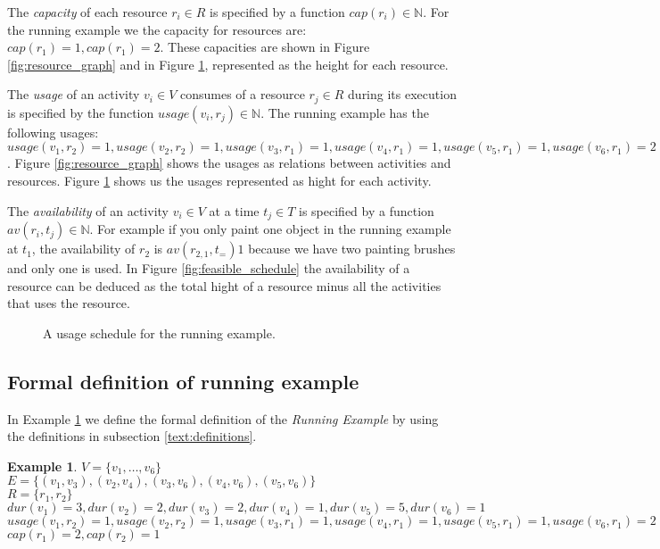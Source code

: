 \documentclass{article}
\theoremstyle{definition}
\newtheorem{example}{Example}[section]
\newcommand{\res}[0]{\ensuremath{R}} %
\newcommand{\av}[2]{\ensuremath{av(r_{#1}, t_{#2})}} %
\newcommand{\capa}[1]{\ensuremath{cap(r_{#1})}} %
\newcommand{\dur}[1]{\ensuremath{dur(v_{#1})}} %
\newcommand{\usage}[2]{\ensuremath{usage(v_{#1}, r_{#2})}} %
\begin{document}
The \emph{capacity} of each resource $r_i \in R$ is specified by a function $\capa{i} \in \mathbb{N}$.
For the running example we the capacity for resources are: $\capa{1} = 1, \capa{1} = 2$.
These capacities are shown in Figure \ref{fig:resource_graph} and in Figure \ref{fig:usage_graph}, represented as the height for each resource.

The \emph{usage} of an activity $v_i \in V$ consumes of a resource $r_j \in \res$ during its execution is specified by the function $\usage{i}{j} \in \mathbb{N}$.
The running example has the following usages: $\usage{1}{2} = 1, \usage{2}{2} = 1, \usage{3}{1} = 1, \usage{4}{1} = 1, \usage{5}{1} = 1, \usage{6}{1} = 2$.
Figure \ref{fig:resource_graph} shows the usages as relations between activities and resources.
Figure \ref{fig:usage_graph} shows us the usages represented as hight for each activity.

The \emph{availability} of an activity $v_i \in V$ at a time $t_j \in T$ is specified by a function $\av{i}{j} \in \mathbb{N}$.
For example if you only paint one object in the running example at $t_1$, the availability of $r_2$ is $\av{2,1} = 1$ because we have two painting brushes and only one is used.
In Figure \ref{fig:feasible_schedule} the availability of a resource can be deduced as the total hight of a resource minus all the activities that uses the resource.

\begin{figure}[h]
	\centering
	
	\caption{A usage schedule for the running example. }
	\label{fig:usage_graph}
\end{figure}

\subsection{Formal definition of running example}

In Example \ref{exmp:running} we define the formal definition of the \emph{Running Example} by using the definitions in subsection \ref{text:definitions}.
\begin{example}
\label{exmp:running}
$V = \{v_1, \ldots, v_6\}$\\
$E = \{(v_1, v_3), (v_2, v_4), (v_3, v_6), (v_4, v_6), (v_5, v_6)\}$\\
$R = \{r_1, r_2\}$\\
$\dur{1} = 3, \dur{2} = 2, \dur{3} = 2, \dur{4} = 1, \dur{5} = 5, \dur{6} = 1$\\
$\usage{1}{2} = 1, \usage{2}{2} = 1, \usage{3}{1} = 1, \usage{4}{1} = 1, \usage{5}{1} = 1, \usage{6}{1} = 2$\\
$\capa{1} = 2, \capa{2} = 1$
\end{example}
\end{document}

